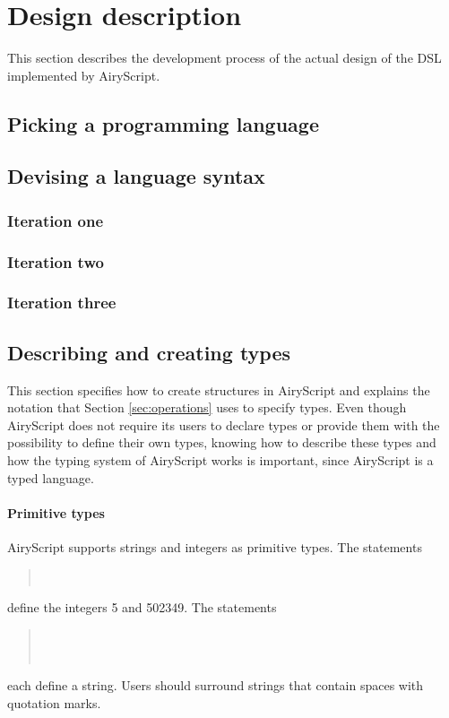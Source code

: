 \section{Design description}
This section describes the development process of the actual design of the DSL
implemented by AiryScript.

\subsection{Picking a programming language}

\subsection{Devising a language syntax}

\subsubsection{Iteration one}

\subsubsection{Iteration two}

\subsubsection{Iteration three}


\subsection{Describing and creating types}
\label{sec:syntax_spec}
This section specifies how to create structures in AiryScript and explains the
notation that Section \ref{sec:operations} uses to specify types. Even though
AiryScript does not require its users to declare types or provide them with
the possibility to define their own types, knowing how to describe these types
and how the typing system of AiryScript works is important, since AiryScript is
a typed language.

\paragraph{Primitive types}
AiryScript supports strings and integers as primitive types. The statements
\begin{quote}
  \\
\end{quote}
define the integers 5 and 502349. The statements
\begin{quote}
  \\
  \\
\end{quote}
each define a string. Users should surround strings that contain spaces with
quotation marks.


